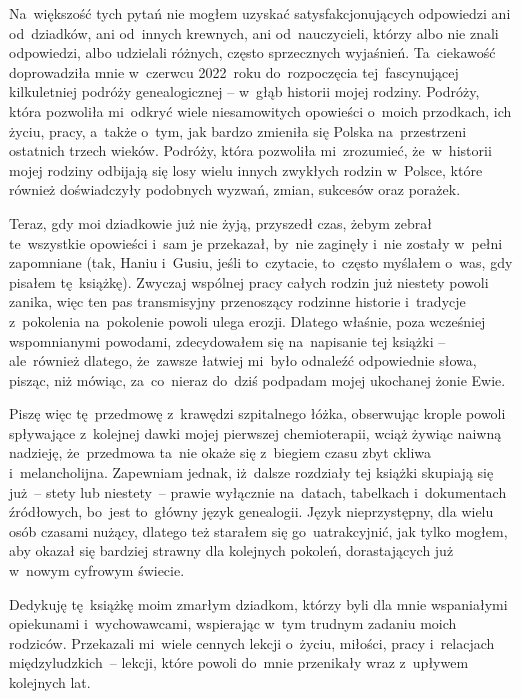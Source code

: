 Na~większość tych pytań nie mogłem uzyskać satysfakcjonujących odpowiedzi ani
od~dziadków, ani od~innych krewnych, ani od~nauczycieli, którzy albo nie znali
odpowiedzi, albo udzielali różnych, często sprzecznych wyjaśnień. Ta~ciekawość
doprowadziła mnie w~czerwcu 2022~roku do~rozpoczęcia tej~fascynującej
kilkuletniej podróży genealogicznej -- w~głąb historii mojej rodziny. Podróży,
która pozwoliła mi~odkryć wiele niesamowitych opowieści o~moich przodkach, ich
życiu, pracy, a~także o~tym, jak bardzo zmieniła się Polska na~przestrzeni
ostatnich trzech wieków. Podróży, która pozwoliła mi~zrozumieć, że~w~historii
mojej rodziny odbijają się losy wielu innych zwykłych rodzin w~Polsce, które
również doświadczyły podobnych wyzwań, zmian, sukcesów oraz porażek.

Teraz, gdy moi dziadkowie już nie żyją, przyszedł czas, żebym zebrał
te~wszystkie opowieści i~sam je przekazał, by~nie zaginęły i~nie zostały
w~pełni zapomniane (tak, Haniu
i~Gusiu, jeśli to~czytacie,
to~często myślałem o~was, gdy pisałem tę~książkę). Zwyczaj wspólnej pracy
całych rodzin już niestety powoli zanika, więc ten pas transmisyjny
przenoszący rodzinne historie i~tradycje z~pokolenia na~pokolenie powoli
ulega erozji. Dlatego właśnie, poza wcześniej wspomnianymi powodami,
zdecydowałem się na~napisanie tej książki -- ale~również dlatego, że~zawsze
łatwiej mi~było odnaleźć odpowiednie słowa, pisząc, niż mówiąc, za~co~nieraz
do~dziś podpadam mojej ukochanej żonie
Ewie.

Piszę więc tę~przedmowę z~krawędzi szpitalnego łóżka, obserwując krople powoli
spływające z~kolejnej dawki mojej pierwszej chemioterapii, wciąż żywiąc
naiwną nadzieję, że~przedmowa ta~nie okaże się z~biegiem czasu zbyt ckliwa
i~melancholijna. Zapewniam jednak, iż~dalsze rozdziały tej książki skupiają
się już~-- stety lub niestety~-- prawie wyłącznie na~datach, tabelkach
i~dokumentach źródłowych, bo~jest to~główny język genealogii. Język
nieprzystępny, dla wielu osób czasami nużący, dlatego też starałem się
go~uatrakcyjnić, jak tylko mogłem, aby okazał się bardziej strawny dla
kolejnych pokoleń, dorastających już w~nowym cyfrowym świecie.

Dedykuję tę~książkę moim zmarłym dziadkom, którzy byli dla mnie wspaniałymi
opiekunami i~wychowawcami, wspierając w~tym trudnym zadaniu moich rodziców.
Przekazali mi~wiele cennych lekcji o~życiu, miłości, pracy i~relacjach
międzyludzkich~-- lekcji, które powoli do~mnie przenikały wraz z~upływem
kolejnych lat.

